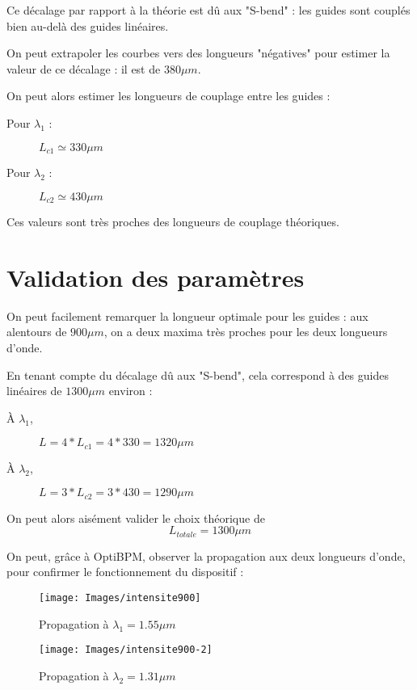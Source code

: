 \documentclass[a4paper,11pt]{report}
\begin{document}
Ce décalage par rapport à la théorie est dû aux "S-bend" : les guides sont couplés bien au-delà des guides linéaires.

On peut extrapoler les courbes vers des longueurs "négatives" pour estimer la valeur de ce décalage : il est de $380\mu m$.

On peut alors estimer les longueurs de couplage entre les guides :
\begin{description}
    \item[Pour $\lambda_1$ :] $L_{c1} \simeq 330\mu m$
    \item[Pour $\lambda_2$ :] $L_{c2} \simeq 430\mu m $
\end{description}

Ces valeurs sont très proches des longueurs de couplage théoriques.

\section{Validation des paramètres}
On peut facilement remarquer la longueur optimale pour les guides : aux alentours de $900\mu m$, on a deux maxima très proches pour les deux longueurs d'onde.

En tenant compte du décalage dû aux "S-bend", cela correspond à des guides linéaires de $1300\mu m$ environ :
\begin{description}
    \item[À $\lambda_1$,] $L = 4*L_{c1} = 4*330 = 1320\mu m$
    \item[À $\lambda_2$,] $L = 3*L_{c2} = 3*430 = 1290\mu m$
\end{description}

On peut alors aisément valider le choix théorique de
\[L_{totale} = 1300\mu m\]
\vspace*{2mm}

On peut, grâce à OptiBPM, observer la propagation aux deux longueurs d'onde, pour confirmer le fonctionnement du dispositif : 
\begin{figure}[h]
    \begin{center}
        \texttt{[image: Images/intensite900]}
        \caption{Propagation à $\lambda_1=1.55\mu m$}
        \vspace*{1cm}
        \texttt{[image: Images/intensite900-2]}
        \caption{Propagation à $\lambda_2=1.31\mu m$}
        \label{fig:}
    \end{center}
\end{figure}
\end{document}
